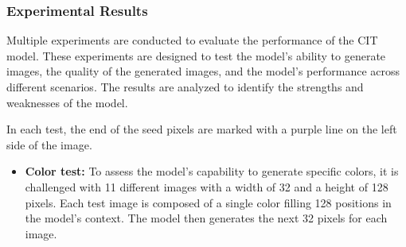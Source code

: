     \subsubsection{Experimental Results}

    Multiple experiments are conducted to evaluate the performance of the CIT model. These experiments are designed to test the model's ability to generate images, the quality of the generated images, and the model's performance across different scenarios. The results are analyzed to identify the strengths and weaknesses of the model.
    
    In each test, the end of the seed pixels are marked with a purple line on the left side of the image.
    
    \begin{itemize}
        \item \textbf{Color test:} To assess the model's capability to generate specific colors, it is challenged with 11 different images with a width of 32 and a height of 128 pixels. Each test image is composed of a single color filling 128 positions in the model's context. The model then generates the next 32 pixels for each image.
    

\end{itemize}
